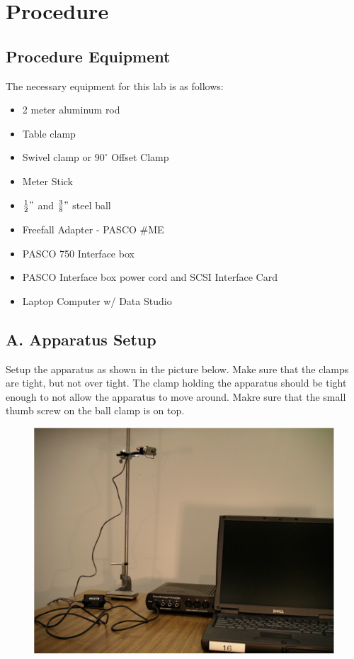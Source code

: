 \chapter{Procedure}

\section{Procedure Equipment}

The necessary equipment for this lab is as follows:
\begin{itemize}
  \item 2 meter aluminum rod
  \item Table clamp
  \item Swivel clamp or $90^\circ$ Offset Clamp
  \item Meter Stick
  \item $\frac{1}{2}"$ and $\frac{3}{8}"$ steel ball
  \item Freefall Adapter - PASCO \#ME
  \item PASCO 750 Interface box
  \item PASCO Interface box power cord and SCSI Interface Card
  \item Laptop Computer w/ Data Studio
\end{itemize}

\section{A. Apparatus Setup}

  Setup the apparatus as shown in the picture below. Make sure that the clamps are tight,
but not over tight. The clamp holding the apparatus should be tight enough to not allow
the apparatus to move around. Makre sure that the small thumb screw on the ball
clamp is on top.

\newpage 

\begin{figure}[htbp]
  \centerline{\includegraphics[scale=0.3]{resources/photo1.jpg}}
\end{figure}

